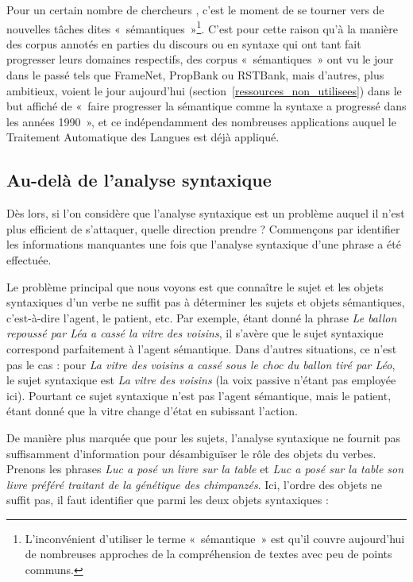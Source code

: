 Pour un certain nombre de chercheurs
\citep{bos2012annotating,banarescu2013abstract}, c'est le moment de se tourner
vers de nouvelles tâches dites «~sémantiques~»\footnote{L'inconvénient
d'utiliser le terme «~sémantique~» est qu'il couvre aujourd'hui de nombreuses
approches de la compréhension de textes avec peu de points communs.}. C'est
pour cette raison qu'à la manière des corpus annotés en parties du discours ou
en syntaxe qui ont tant fait progresser leurs domaines respectifs, des corpus
«~sémantiques~» ont vu le jour dans le passé tels que FrameNet, PropBank ou
RSTBank, mais d'autres, plus ambitieux, voient le jour aujourd'hui
\citep{bos2012annotating,banarescu2013abstract}
(section~\ref{ressources_non_utilisees}) dans le but affiché de «~faire
progresser la sémantique comme la syntaxe a progressé dans les années 1990~»,
et ce indépendamment des nombreuses applications auquel le Traitement
Automatique des Langues est déjà appliqué.

\subsection{Au-delà de l'analyse syntaxique}

Dès lors, si l'on considère que l'analyse syntaxique est un problème auquel il
n'est plus efficient de s'attaquer, quelle direction prendre ? Commençons par
identifier les informations manquantes une fois que l'analyse syntaxique d'une
phrase a été effectuée.

Le problème principal que nous voyons est que connaître le sujet et les objets
syntaxiques d'un verbe ne suffit pas à déterminer les sujets et objets
sémantiques, c'est-à-dire l'agent, le patient, etc. Par exemple, étant donné la
phrase \emph{Le ballon repoussé par Léa a cassé la vitre des voisins}, il
s'avère que le sujet syntaxique correspond parfaitement à l'agent sémantique.
Dans d'autres situations, ce n'est pas le cas : pour \emph{La vitre des voisins
a cassé sous le choc du ballon tiré par Léo}, le sujet syntaxique est \emph{La
vitre des voisins} (la voix passive n'étant pas employée ici). Pourtant ce
sujet syntaxique n'est pas l'agent sémantique, mais le patient, étant donné que
la vitre change d'état en subissant l'action.

De manière plus marquée que pour les sujets, l'analyse syntaxique ne fournit
pas suffisamment d'information pour désambiguïser le rôle des objets du verbes.
Prenons les phrases \emph{Luc a posé un livre sur la table} et \emph{Luc a
posé sur la table son livre préféré traitant de la génétique des chimpanzés}.
Ici, l'ordre des objets ne suffit pas, il faut identifier que parmi les deux
objets syntaxiques :

